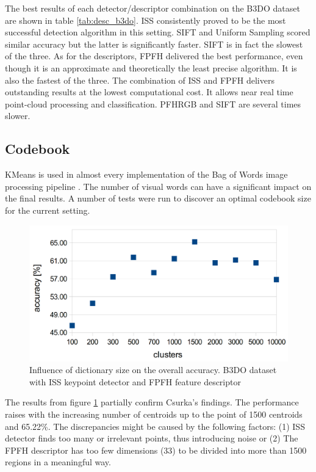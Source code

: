 \documentclass[12pt]{article}
\begin{document}
    The best results of each detector/descriptor combination on the B3DO 
dataset are shown in table \ref{tab:desc_b3do}. ISS consistently proved to be 
the most successful detection algorithm in this setting. SIFT and Uniform 
Sampling scored similar accuracy but the latter is significantly faster. SIFT 
is in fact the slowest of the three. As for the descriptors, FPFH delivered the 
best performance, even though it is an approximate and theoretically the least 
precise algorithm. It is also the fastest of the three. The combination of ISS 
and FPFH delivers outstanding results at the lowest computational cost. It 
allows near real time point-cloud processing and classification. PFHRGB and 
SIFT are several times slower.
      
  \subsection{Codebook}
    KMeans is used in almost every implementation of the Bag of Words image 
processing pipeline \cite{tsai2012bag}. The number of visual words can have a 
significant impact on the final results. A number of tests were run to discover 
an optimal codebook size for the current setting.

    \begin{figure}[!ht]
    \centering	
    \includegraphics[width=.75\textwidth]{figs/clustering_centroids_b3do}
    \caption{Influence of dictionary size on the overall accuracy. B3DO dataset 
with ISS keypoint detector and FPFH feature descriptor}
    \label{fig:cluster_b3do}
    \end{figure}

    The results from figure \ref{fig:cluster_b3do} partially confirm Csurka's 
findings. The performance raises with the increasing number of centroids up to 
the point of 1500 centroids and 65.22\%. The discrepancies might be caused by 
the following factors: (1) ISS detector finds too many or irrelevant points, 
thus introducing noise or (2) The FPFH descriptor has too few dimensions (33) 
to be divided into more than 1500 regions in a meaningful way. 
\end{document}
